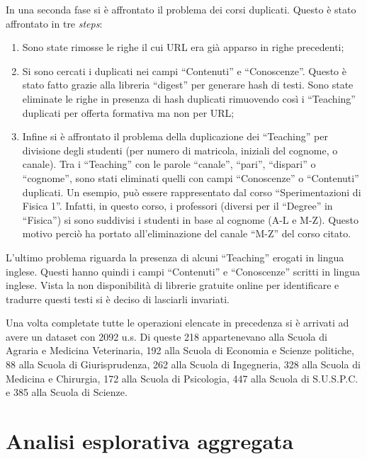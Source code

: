 \documentclass[10pt,a4paper,twoside]{tau-book}
\begin{document}
In una seconda fase si è affrontato il problema dei corsi duplicati. Questo è stato affrontato in tre \textit{steps}:
\begin{enumerate}
    \item Sono state rimosse le righe il cui URL era già apparso in righe precedenti;
    \item Si sono cercati i duplicati nei campi “Contenuti” e “Conoscenze”. Questo è stato fatto grazie alla libreria “digest” per generare hash di testi. Sono state eliminate le righe in presenza di hash duplicati rimuovendo così i “Teaching” duplicati per offerta formativa ma non per URL;
    \item Infine si è affrontato il problema della duplicazione dei “Teaching” per divisione degli studenti (per numero di matricola, iniziali del cognome, o canale). Tra i “Teaching” con le parole “canale”, “pari”, “dispari” o “cognome”, sono stati eliminati quelli con campi “Conoscenze” o “Contenuti” duplicati. Un esempio, può essere rappresentato dal corso “Sperimentazioni di Fisica 1”. Infatti, in questo corso, i professori (diversi per il “Degree” in “Fisica”) si sono suddivisi i studenti in base al cognome (A-L e M-Z). Questo motivo perciò ha portato all'eliminazione del canale “M-Z” del corso citato.
\end{enumerate}

L'ultimo problema riguarda la presenza di alcuni “Teaching” erogati in lingua inglese. Questi hanno quindi i campi “Contenuti” e “Conoscenze” scritti in lingua inglese. Vista la non disponibilità di librerie gratuite online per identificare e tradurre questi testi si è deciso di lasciarli invariati.

Una volta completate tutte le operazioni elencate in precedenza si è arrivati ad avere un dataset con 2092 u.s. Di queste 218 appartenevano alla Scuola di Agraria e Medicina Veterinaria, 192 alla Scuola di Economia e Scienze politiche, 88 alla Scuola di Giurisprudenza, 262 alla Scuola di Ingegneria, 328 alla Scuola di Medicina e Chirurgia, 172 alla Scuola di Psicologia, 447 alla Scuola di S.U.S.P.C. e 385 alla Scuola di Scienze.

\section{Analisi esplorativa aggregata}
\label{sec:analisi_esplorativa_aggregata}
\end{document}
